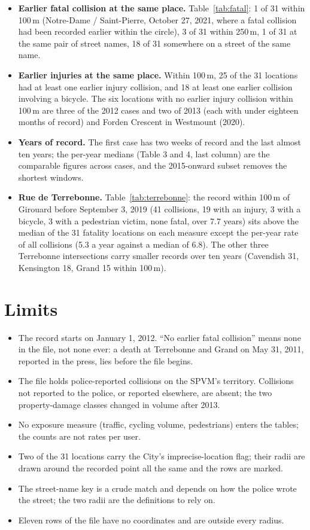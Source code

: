 \documentclass[11pt,letterpaper]{article}
\begin{document}
\begin{itemize}[leftmargin=1.2em]
\item \textbf{Earlier fatal collision at the same place.} Table~\ref{tab:fatal}: 1 of 31 within 100\,m (Notre-Dame / Saint-Pierre, October 27, 2021, where a fatal collision had been recorded earlier within the circle), 3 of 31 within 250\,m, 1 of 31 at the same pair of street names, 18 of 31 somewhere on a street of the same name.
\item \textbf{Earlier injuries at the same place.} Within 100\,m, 25 of the 31 locations had at least one earlier injury collision, and 18 at least one earlier collision involving a bicycle. The six locations with no earlier injury collision within 100\,m are three of the 2012 cases and two of 2013 (each with under eighteen months of record) and Forden Crescent in Westmount (2020).
\item \textbf{Years of record.} The first case has two weeks of record and the last almost ten years; the per-year medians (Table 3 and 4, last column) are the comparable figures across cases, and the 2015-onward subset removes the shortest windows.
\item \textbf{Rue de Terrebonne.} Table~\ref{tab:terrebonne}: the record within 100\,m of Girouard before September 3, 2019 (41 collisions, 19 with an injury, 3 with a bicycle, 3 with a pedestrian victim, none fatal, over 7.7 years) sits above the median of the 31 fatality locations on each measure except the per-year rate of all collisions (5.3 a year against a median of 6.8). The other three Terrebonne intersections carry smaller records over ten years (Cavendish 31, Kensington 18, Grand 15 within 100\,m).
\end{itemize}

\section{Limits}

\begin{itemize}[leftmargin=1.2em]
\item The record starts on January 1, 2012. ``No earlier fatal collision'' means none in the file, not none ever: a death at Terrebonne and Grand on May 31, 2011, reported in the press, lies before the file begins.
\item The file holds police-reported collisions on the SPVM's territory. Collisions not reported to the police, or reported elsewhere, are absent; the two property-damage classes changed in volume after 2013.
\item No exposure measure (traffic, cycling volume, pedestrians) enters the tables; the counts are not rates per user.
\item Two of the 31 locations carry the City's imprecise-location flag; their radii are drawn around the recorded point all the same and the rows are marked.
\item The street-name key is a crude match and depends on how the police wrote the street; the two radii are the definitions to rely on.
\item Eleven rows of the file have no coordinates and are outside every radius.
\end{itemize}
\end{document}
